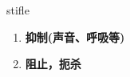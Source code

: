 
\begin{frame}
{\huge stifle}
\begin{center}
\begin{enumerate}\Large
  \item \textbf{抑制(声音、呼吸等)}
  \item \textbf{阻止，扼杀}
\end{enumerate}
\end{center}
\end{frame}
